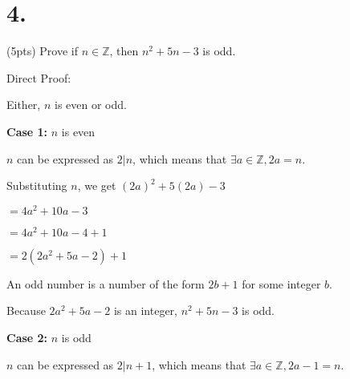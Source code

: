 \documentclass{article}
\newenvironment{Problem}
{\noindent\color{black}}
{\newline}
\newenvironment{Solution}
{\noindent\color{red}}
{\newline}
\begin{document}
\vspace*{16em}

\section*{4. }

\begin{Problem}
    (5pts) Prove if $n \in \mathbb Z$, then $n^2+5n-3$ is odd.
\end{Problem}


\begin{Solution}
    Direct Proof:

    \begin{adjustwidth}{2em}{0em}
            

        Either, $n$ is even or odd.

        \phantom{ }

        \textbf{Case 1: }$n$ is even

        \begin{adjustwidth}{2em}{0em}
            $n$ can be expressed as $2|n$, which means that
            $\exists a \in \mathbb Z, 2a = n$.

            \phantom{ }

            Substituting $n$, we get $(2a)^2 + 5(2a) - 3$

            \hspace*{9em}$= 4a^2 + 10a - 3$

            \hspace*{9em}$= 4a^2 + 10a - 4 + 1$

            \hspace*{9em}$= 2(2a^2 + 5a - 2) + 1$

            \phantom{ }

            An odd number is a number of the form $2b + 1$
            for some integer $b$. 
            
            Because $2a^2 + 5a - 2$ is an
            integer, $n^2 + 5n - 3$ is odd. 
        \end{adjustwidth}

        \phantom{ }

        \textbf{Case 2: }$n$ is odd

        \begin{adjustwidth}{2em}{0em}
            $n$ can be expressed as $2|n+1$, which means that
            $\exists a \in \mathbb Z, 2a - 1 = n$.

            \phantom{ }


\end{adjustwidth}
\end{adjustwidth}
\end{Solution}
\end{document}
